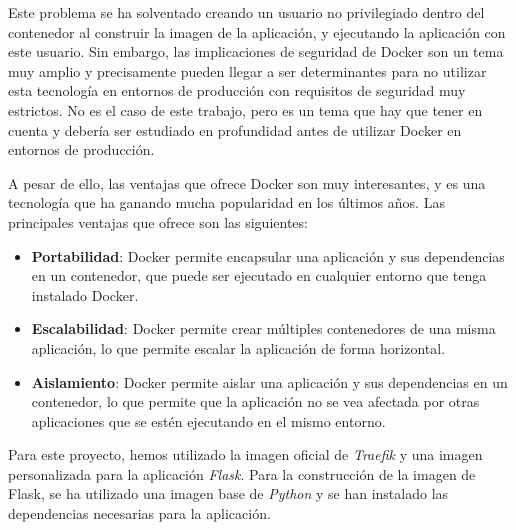 Este problema se ha solventado creando un usuario no privilegiado dentro del contenedor al construir la imagen de la aplicación, y ejecutando la aplicación con este usuario.
Sin embargo, las implicaciones de seguridad de Docker son un tema muy amplio y precisamente pueden llegar a ser determinantes para no utilizar esta tecnología en entornos de producción con requisitos de seguridad muy estrictos.
No es el caso de este trabajo, pero es un tema que hay que tener en cuenta y debería ser estudiado en profundidad antes de utilizar Docker en entornos de producción.

A pesar de ello, las ventajas que ofrece Docker son muy interesantes, y es una tecnología que ha ganando mucha popularidad en los últimos años.
Las principales ventajas que ofrece son las siguientes:

\begin{itemize}
    \item \textbf{Portabilidad}: Docker permite encapsular una aplicación y sus dependencias en un contenedor, que puede ser ejecutado en cualquier entorno que tenga instalado Docker.
    \item \textbf{Escalabilidad}: Docker permite crear múltiples contenedores de una misma aplicación, lo que permite escalar la aplicación de forma horizontal.
    \item \textbf{Aislamiento}: Docker permite aislar una aplicación y sus dependencias en un contenedor, lo que permite que la aplicación no se vea afectada por otras aplicaciones que se estén ejecutando en el mismo entorno.
\end{itemize}

Para este proyecto, hemos utilizado la imagen oficial de \textit{Traefik} y una imagen personalizada para la aplicación \textit{Flask}.
Para la construcción de la imagen de Flask, se ha utilizado una imagen base de \textit{Python} y se han instalado las dependencias necesarias para la aplicación.

